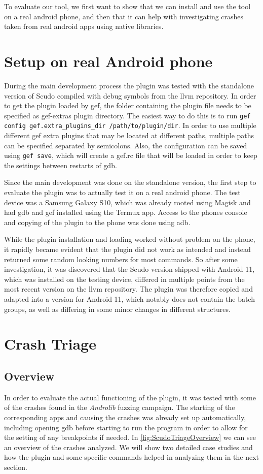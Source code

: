\documentclass[a4paper,11pt,oneside]{report}
\begin{document}
To evaluate our tool, we first want to show that we can install and use the
tool on a real android phone, and then that it can help with investigating
crashes taken from real android apps using native libraries.

\section{Setup on real Android phone}

During the main development process the plugin was tested with the standalone
version of Scudo compiled with debug symbols from the llvm repository. In
order to get the plugin loaded by gef, the folder containing the plugin file
needs to be specified as gef-extras plugin directory. The easiest way to do this
is to run \verb|gef config gef.extra_plugins_dir /path/to/plugin/dir|. In order
to use multiple different gef extra plugins that may be located at different
paths, multiple paths can be specified separated by semicolons. Also, the
configuration can be saved using \verb|gef save|, which will create a gef.rc file
that will be loaded in order to keep the settings between restarts of gdb.

Since the main development was done on the standalone version, the first step
to evaluate the plugin was to actually test it on a real android phone. The
test device was a Samsung Galaxy S10, which was already rooted using Magisk
and had gdb and gef installed using the Termux app. Access to the phones
console and copying of the plugin to the phone was done using adb.

While the plugin installation and loading worked without problem on the phone, it
rapidly became evident that the plugin did not work as intended and instead
returned some random looking numbers for most commands. So after some
investigation, it was discovered that the Scudo version shipped with Android
11, which was installed on the testing device, differed in multiple points
from the most recent version on the llvm repository. The plugin was therefore
copied and adapted into a version for Android 11, which notably does not
contain the batch groups, as well as differing in some minor changes in
different structures.

\section{Crash Triage}

\subsection{Overview}
In order to evaluate the actual functioning of the plugin, it was tested with
some of the crashes found in the \textit{Androlib} fuzzing campaign. 
The starting of the corresponding apps and causing the crashes was already
set up automatically, including opening gdb before starting to run the program
in order to allow for the setting of any breakpoints if needed. In
\autoref{fig:ScudoTriageOverview} we can see an overview of the crashes analyzed.
We will show two detailed case studies and how the plugin and some specific
commands helped in analyzing them in the next section.
\end{document}
